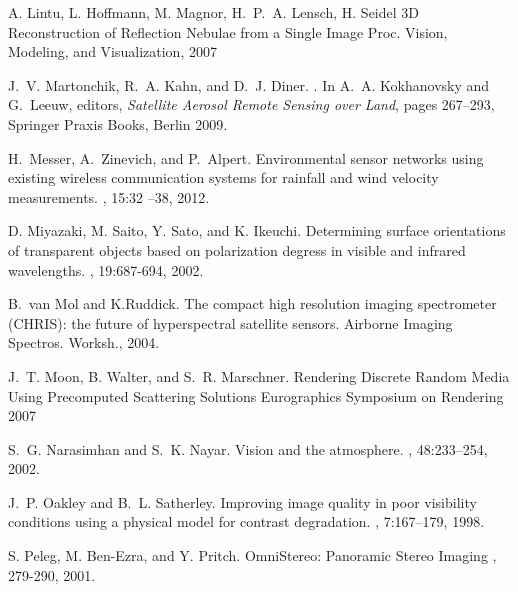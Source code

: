 \documentclass[10pt,twocolumn,letterpaper]{article}
\begin{document}
{\begin{thebibliography}{10}
A. Lintu, L. Hoffmann, M. Magnor, H.~P.~A. Lensch, H. Seidel
\newblock 3D Reconstruction of Reflection Nebulae from a Single Image
\newblock Proc. Vision, Modeling, and Visualization, 2007

J.~V. Martonchik, R.~A. Kahn, and D.~J. Diner.
.
\newblock In A.~A. Kokhanovsky and G.~Leeuw, editors, {\em Satellite Aerosol
  Remote Sensing over Land}, pages 267--293, Springer Praxis Books,
  Berlin 2009.

H.~Messer, A.~Zinevich, and P.~Alpert.
\newblock Environmental sensor networks using existing wireless communication
  systems for rainfall and wind velocity measurements.
, 15:32 --38, 2012.

D. Miyazaki, M. Saito, Y. Sato, and K. Ikeuchi.
\newblock Determining surface orientations of transparent objects based on polarization degress in visible and infrared wavelengths.
, 19:687-694, 2002.

B.~van Mol and K.Ruddick.
\newblock The compact high resolution imaging spectrometer (CHRIS): the future
  of hyperspectral satellite sensors.
\newblock Airborne Imaging Spectros. Worksh., 2004.

J.~T. Moon, B. Walter, and S.~R. Marschner.
\newblock Rendering Discrete Random Media Using Precomputed Scattering Solutions
\newblock Eurographics Symposium on Rendering 2007


S.~G. Narasimhan and S.~K. Nayar.
\newblock Vision and the atmosphere.
, 48:233--254,  2002.

J.~P. Oakley and B.~L. Satherley.
\newblock Improving image quality in poor visibility conditions using a
  physical model for contrast degradation.
, 7:167--179, 1998.

S. Peleg, M. Ben-Ezra, and Y. Pritch.
\newblock OmniStereo: Panoramic Stereo Imaging
, 279-290, 2001.


\end{thebibliography}}
\end{document}

